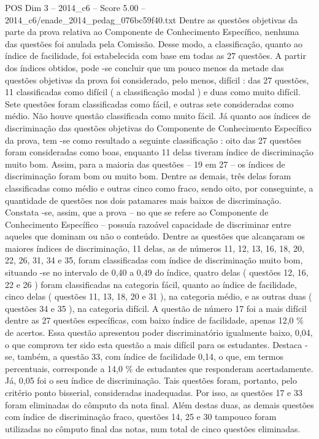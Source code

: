 \begin{textsample}{POS Dim 3 – 2014\_c6 – Score 5.00 – 2014\_c6/enade\_2014\_pedag\_076bc59f40.txt}
Dentre as questões objetivas da parte da prova relativa ao Componente de Conhecimento Específico, nenhuma das questões foi anulada pela Comissão.
Desse modo, a classificação, quanto ao índice de facilidade, foi estabelecida com base em todas as 27 questões.
A partir dos índices obtidos, pode -se concluir que um pouco menos da metade das questões objetivas da prova foi considerado, pelo menos, difícil : das 27 questões, 11 classificadas como difícil ( a classificação modal ) e duas como muito difícil.
Sete questões foram classificadas como fácil, e outras sete consideradas como médio.
Não houve questão classificada como muito fácil.
Já quanto aos índices de discriminação das questões objetivas do Componente de Conhecimento Específico da prova, tem -se como resultado a seguinte classificação : oito das 27 questões foram consideradas como boas, enquanto 11 delas tiveram índice de discriminação muito bom.
Assim, para a maioria das questões – 19 em 27 – os índices de discriminação foram bom ou muito bom.
Dentre as demais, três delas foram classificadas como médio e outras cinco como fraco, sendo oito, por conseguinte, a quantidade de questões nos dois patamares mais baixos de discriminação.
Constata -se, assim, que a prova – no que se refere ao Componente de Conhecimento Específico – possuía razoável capacidade de discriminar entre aqueles que dominam ou não o conteúdo.
Dentre as questões que alcançaram os maiores índices de discriminação, 11 delas, as de números 11, 12, 13, 16, 18, 20, 22, 26, 31, 34 e 35, foram classificadas com índice de discriminação muito bom, situando -se no intervalo de 0,40 a 0,49 do índice, quatro delas ( questões 12, 16, 22 e 26 ) foram classificadas na categoria fácil, quanto ao índice de facilidade, cinco delas ( questões 11, 13, 18, 20 e 31 ), na categoria médio, e as outras duas ( questões 34 e 35 ), na categoria difícil.
A questão de número 17 foi a mais difícil dentre as 27 questões específicas, com baixo índice de facilidade, apenas 12,0 \% de acertos.
Essa questão apresentou poder discriminatório igualmente baixo, 0,04, o que comprova ter sido esta questão a mais difícil para os estudantes.
Destaca -se, também, a questão 33, com índice de facilidade 0,14, o que, em termos percentuais, corresponde a 14,0 \% de estudantes que responderam acertadamente.
Já, 0,05 foi o seu índice de discriminação.
Tais questões foram, portanto, pelo critério ponto bisserial, consideradas inadequadas.
Por isso, as questões 17 e 33 foram eliminadas do cômputo da nota final.
Além destas duas, as demais questões com índice de discriminação fraco, questões 14, 25 e 30 tampouco foram utilizadas no cômputo final das notas, num total de cinco questões eliminadas.

\end{textsample}
